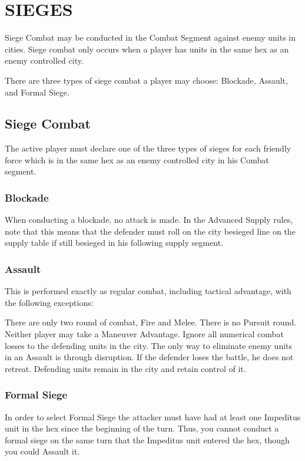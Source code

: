\section{SIEGES}

Siege Combat may be conducted in the Combat Segment against enemy units in cities. Siege combat only occurs when a player has units in the same hex as an enemy controlled city.

There are three types of siege combat a player may choose: Blockade, Assault, and Formal Siege.

\subsection{Siege Combat}

The active player must declare one of the three types of sieges for each friendly force which is in the same hex as an enemy controlled city in his Combat segment.

\subsubsection{Blockade}

When conducting a blockade, no attack is made. In the Advanced Supply rules, note that this means that the defender must roll on the city besieged line on the supply table if still besieged in his following supply segment.

\subsubsection{Assault}

This is performed exactly as regular combat, including tactical advantage, with the following exceptions:

There are only two round of combat, Fire and Melee. There is no Pursuit round.
Neither player may take a Maneuver Advantage.
Ignore all numerical combat losses to the defending units in the city. The only way to eliminate enemy units in an Assault is through disruption.
If the defender loses the battle, he does not retreat. Defending units remain in the city and retain control of it.

\subsubsection{Formal Siege}

In order to select Formal Siege the attacker must have had at least one Impeditus unit in the hex since the beginning of the turn. Thus, you cannot conduct a formal siege on the same turn that the Impeditus unit entered the hex, though you could Assault it.

